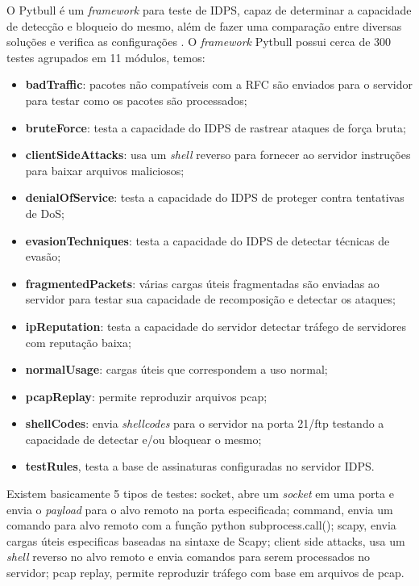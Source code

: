 \documentclass[
	12pt,				
	openright,		
	twoside,	
	a4paper,
	english,	
	brazil	
	]{abntex2}
\begin{document}
 O Pytbull é um \textit{framework} para teste de IDPS, capaz de determinar a capacidade de detecção e bloqueio do mesmo, além de fazer uma comparação entre diversas soluções e verifica as configurações \cite{pytbull}. O \textit{framework} Pytbull possui cerca de 300 testes agrupados em 11 módulos, temos:

 \begin{itemize}
  \item \textbf{badTraffic}: pacotes não compatíveis com a RFC são enviados para o servidor para testar como os pacotes são processados; 
  \item \textbf{bruteForce}: testa a capacidade do IDPS de rastrear ataques de força bruta;
  \item \textbf{clientSideAttacks}: usa um \textit{shell} reverso para fornecer ao servidor instruções para baixar arquivos maliciosos; 
  \item \textbf{denialOfService}: testa a capacidade do IDPS de proteger contra tentativas de DoS; 
  \item \textbf{evasionTechniques}: testa a capacidade do IDPS de detectar técnicas de evasão; 
  \item \textbf{fragmentedPackets}: várias cargas úteis fragmentadas são enviadas ao servidor para testar sua capacidade de recomposição e detectar os ataques; 
  \item \textbf{ipReputation}: testa a capacidade do servidor detectar tráfego de servidores com reputação baixa;
  \item \textbf{normalUsage}: cargas úteis que correspondem a uso normal; 
  \item \textbf{pcapReplay}: permite reproduzir arquivos pcap; 
  \item \textbf{shellCodes}: envia \textit{shellcodes} para o servidor na porta 21/ftp testando a capacidade de detectar e/ou bloquear o mesmo; 
  \item \textbf{testRules}, testa a base de assinaturas configuradas no servidor IDPS.
 \end{itemize}

 Existem basicamente 5 tipos de testes: socket, abre um \textit{socket} em uma porta e envia o \textit{payload} para o alvo remoto na porta especificada; command, envia um comando para alvo remoto com a função python subprocess.call(); scapy, envia cargas úteis especificas baseadas na sintaxe de Scapy; client side attacks, usa um \textit{shell} reverso no alvo remoto e envia comandos para serem processados no servidor; pcap replay, permite reproduzir tráfego com base em arquivos de pcap.
\end{document}
